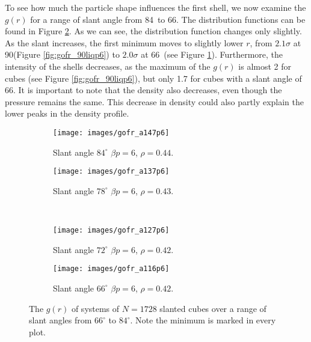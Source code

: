 \documentclass[thesis]{subfiles}
\begin{document}
To see how much the particle shape influences the first shell, we now examine the $g(r)$ for a range of slant angle from 84\degr\ to 66\degr. The distribution functions can be found in Figure \ref{fig:gofr_non90liq}. As we can see, the distribution function changes only slightly. As the slant increases, the first minimum moves to slightly lower $r$, from $2.1\sigma$ at 90\degr (Figure \ref{fig:gofr_90liqp6}) to $2.0\sigma$ at 66\degr\ (see Figure \ref{fig:gofr_non90liqa66}). Furthermore, the intensity of the shells decreases, as the maximum of the $g(r)$ is almost 2 for cubes (see Figure \ref{fig:gofr_90liqp6}), but only 1.7 for cubes with a slant angle of 66\degr. It is important to note that the density also decreases, even though the pressure remains the same. This decrease in density could also partly explain the lower peaks in the density profile.

\begin{figure}[H]
	\centering
	\begin{subfigure}{0.49\textwidth}
		\texttt{[image: images/gofr\_a147p6]}
		\caption{Slant angle $84^\circ$ $\beta p = 6$, $\rho = 0.44$. }
	\end{subfigure}
	\begin{subfigure}{0.49\textwidth}
		\texttt{[image: images/gofr\_a137p6]}
		\caption{Slant angle $78^\circ$ $\beta p = 6$, $\rho = 0.43$. }
	\end{subfigure}
	\\
	\vspace{10pt}
	\begin{subfigure}{0.49\textwidth}
		\texttt{[image: images/gofr\_a127p6]}
		\caption{Slant angle $72^\circ$ $\beta p = 6$, $\rho = 0.42$. }
	\end{subfigure}
	\begin{subfigure}{0.49\textwidth}
		\texttt{[image: images/gofr\_a116p6]}
		\caption{Slant angle $66^\circ$ $\beta p = 6$, $\rho = 0.42$. }\label{fig:gofr_non90liqa66}
	\end{subfigure}
	
	\caption{The $g(r)$ of systems of $N = 1728$ slanted cubes over a range of slant angles from $66^\circ$ to $84^\circ$. Note the minimum is marked in every plot.}\label{fig:gofr_non90liq}
\end{figure}
\end{document}
